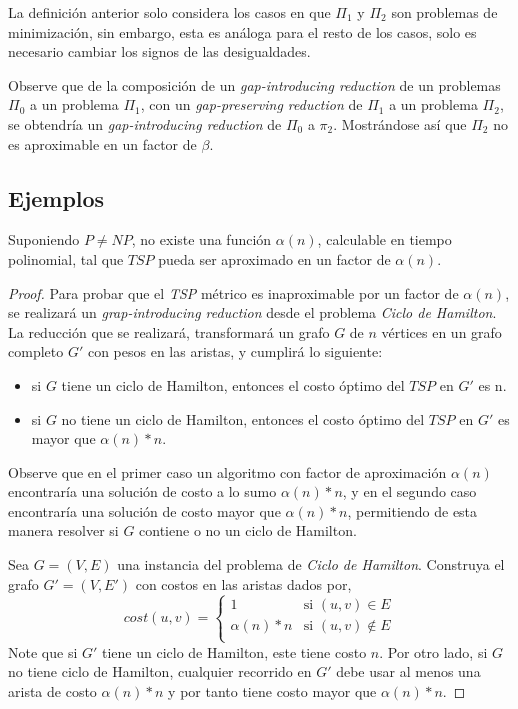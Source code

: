 \documentclass[../np-approximations.tex]{subfiles}
\begin{document}
\begin{note}
	La definición anterior solo considera los casos en que $\Pi_1$ 
	y $\Pi_2$ son problemas de minimización, sin embargo, esta es 
	análoga para el resto de los casos, solo es necesario cambiar 
	los signos de las desigualdades.
\end{note}

Observe que de la composición de un \emph{gap-introducing reduction}
de un problemas $\Pi_0$ a un problema $\Pi_1$, con un \emph
{gap-preserving reduction} de $\Pi_1$ a un problema $\Pi_2$, se 
obtendría un \emph{gap-introducing reduction} de $\Pi_0$ a $\pi_2$. 
Mostrándose así que $\Pi_2$ no es aproximable en un factor de 
$\beta$.

\subsection{Ejemplos}

\begin{theorem}
    Suponiendo $P \neq NP$, no existe una función $\alpha(n)$, 
    calculable en tiempo polinomial, tal que $TSP$ pueda ser 
    aproximado en un factor de $\alpha(n)$.
\end{theorem}

\begin{proof}
	Para probar que el \emph{TSP} métrico es inaproximable por un 
	factor de $\alpha(n)$, se realizará un
	\emph{grap-introducing reduction} desde el problema
	\emph{Ciclo de Hamilton}. La reducción que se realizará, 
	transformará un grafo $G$ de $n$ vértices en un grafo completo 
	$G'$ con pesos en las aristas, y cumplirá lo siguiente:
	\begin{itemize}
		\item si $G$ tiene un ciclo de Hamilton, entonces el costo 
		      óptimo del $TSP$ en $G'$ es n.
		\item si $G$ no tiene un ciclo de Hamilton, entonces el 
              costo óptimo del $TSP$ en $G'$ es mayor que
              $\alpha(n)*n$.
	\end{itemize}
	Observe que en el primer caso un algoritmo con factor de 
	aproximación $\alpha(n)$ encontraría una solución de costo a lo 
	sumo $\alpha(n)*n$, y en el segundo caso encontraría una 
	solución de costo mayor que $\alpha(n)*n$, permitiendo de esta 
	manera resolver si $G$ contiene o no un ciclo de Hamilton.
	    
	Sea $G=(V,E)$ una instancia del problema de
	\emph{Ciclo de Hamilton}. Construya el grafo
	$G'=(V,E')$ con costos en las aristas dados por,
	\begin{equation*}
		cost(u,v)=
		\begin{cases}
			1           & \text{si $(u,v) \in E$}    \\
			\alpha(n)*n & \text{si $(u,v) \notin E$} \\
		\end{cases}
	\end{equation*}
    Note que si $G'$ tiene un ciclo de Hamilton, este tiene 
	costo $n$. Por otro lado, si $G$ no tiene ciclo de Hamilton, 
	cualquier recorrido en $G'$ debe usar al menos una arista de 
	costo $\alpha(n)*n$ y por tanto tiene costo mayor que
	$\alpha(n)*n$.
\end{proof}
\end{document}
